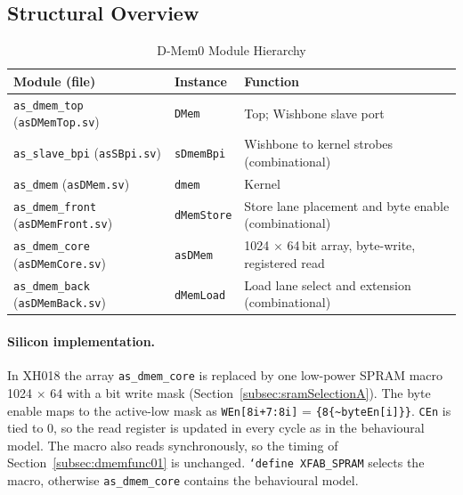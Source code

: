 \subsection{Structural Overview}

\begin{table}[H]
\caption{D-Mem0 Module Hierarchy}
\label{tab:asDmemHier}
\centering
\begin{tabularx}{\textwidth}{|l |l |X|}
  \hline
  Module (file) & Instance & Function \\
  \hline
  \hline
  \texttt{as\_dmem\_top} (\texttt{asDMemTop.sv}) & \texttt{DMem} & Top; Wishbone slave port \\
  \hline
  \quad \texttt{as\_slave\_bpi} (\texttt{asSBpi.sv}) & \texttt{sDmemBpi} & Wishbone to kernel strobes (combinational) \\
  \hline
  \quad \texttt{as\_dmem} (\texttt{asDMem.sv}) & \texttt{dmem} & Kernel \\
  \hline
  \quad\quad \texttt{as\_dmem\_front} (\texttt{asDMemFront.sv}) & \texttt{dMemStore} & Store lane placement and byte enable (combinational) \\
  \hline
  \quad\quad \texttt{as\_dmem\_core} (\texttt{asDMemCore.sv}) & \texttt{asDMem} & 1024 $\times$ 64\,bit array, byte-write, registered read \\
  \hline
  \quad\quad \texttt{as\_dmem\_back} (\texttt{asDMemBack.sv}) & \texttt{dMemLoad} & Load lane select and extension (combinational) \\
  \hline
\end{tabularx}
\end{table}

\paragraph{Silicon implementation.}
In XH018 the array \texttt{as\_dmem\_core} is replaced by one low-power SPRAM macro
1024 $\times$ 64 with a bit write mask (Section~\ref{subsec:sramSelectionA}).
The byte enable maps to the active-low mask as
\texttt{WEn[8i+7:8i]} = \texttt{\{8\{\textasciitilde byteEn[i]\}\}}.
\texttt{CEn} is tied to 0, so the read register is updated in every cycle
as in the behavioural model. The macro also reads synchronously, so the timing
of Section~\ref{subsec:dmemfunc01} is unchanged. \texttt{`define XFAB\_SPRAM}
selects the macro, otherwise \texttt{as\_dmem\_core} contains the
behavioural model.

